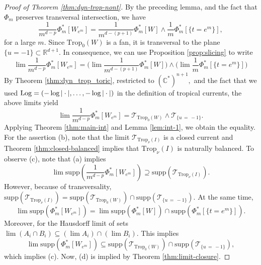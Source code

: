 \documentclass[11pt]{amsart}
\def\Log{{\rm Log}}
\theoremstyle{definition}
\newcommand{\R}{\mathbb{R}}
\newcommand{\C}{\mathbb{C}}
\newcommand{\sT}{\mathscr{T}}
\newcommand{\Trop}{\mathrm{Trop}}
\newcommand{\supp}[1]{{\mathrm{supp}(#1)}}
\begin{document}
\begin{proof}[Proof of Theorem \ref{thm:dyn-trop-nont}]
  By the preceding lemma, and the fact that $\Phi_m$ preserves transversal intersection, we have 
  $$ \frac{1}{m^{d-p}}\Phi_m^* [W_{e^m}] = \frac{1}{m^{d-(p+1)}} \Phi_m^*[W] \wedge \frac{1}{m} \Phi_m^*[\{t= e^m\}],$$
  for a large $m.$ Since $\Trop_0(W)$ is a fan, it is transversal to the plane $\{u =-1\} \subset \R^{d+1}$. In consequence, we can use Proposition \ref{prop:slicing} to write
  $$
  \lim \frac{1}{m^{d-p}}\Phi_m^* [W_{e^m}] = \big(\lim  \frac{1}{m^{d-(p+1)}} \Phi_m^*[W]   \big) \wedge \big(\lim \frac{1}{m} \Phi_m^*[\{t= e^m\}] \big)
  $$
 By Theorem \ref{thm:dyn_trop_toric}, restricted to $(\C^*)^{n+1},$ and the fact that we used $\Log = (-\log|\cdot| , \dots , -\log|\cdot|)$ in the definition of tropical currents,  the above limits yield
  $$
    \lim \frac{1}{m^{d-p}}\Phi_m^* [W_{e^m}] = \sT_{\Trop_0(W)} \wedge \sT_{\{u\, = \, -1\}}.
  $$
  Applying Theorem \ref{thm:main-int} and Lemma \ref{lem:int-1}, we obtain the equality. 
  \vskip 2mm
  For the assertion (b), note that the limit $\sT_{\Trop_{\nu}(I)}$ is a closed current and Theorem \ref{thm:closed-balanced} implies that $\Trop_{\nu}(I)$ is naturally balanced. To observe (c), note that (a) implies 
  $$
  \lim \supp{\frac{1}{m^{d-p}}\Phi_m^* [W_{e^m}]}  \supseteq \supp{\sT_{\Trop_{\nu}(I)}}.
  $$
  However, because of transversality,   $\supp{\sT_{\Trop_{\nu}(I)}} = \supp{\sT_{\Trop_0(W)}} \cap \supp{ \sT_{\{u\, = \, -1\}}}.$ At the same time, 
 $$
  \lim \supp{\Phi_m^*[W_{e^m}]} = \lim \supp { \Phi_m^*[W] } \cap \supp{\Phi_m^*[\{t= e^m\}]}.
 $$
Moreover, for the Hausdorff limit of sets $\lim (A_i \cap B_i) \subseteq (\lim A_i) \cap (\lim B_i).$ This implies
$$
  \lim \supp{\Phi_m^*[W_{e^m}]} \subseteq \supp{\sT_{\Trop_0(W)}} \cap \supp{ \sT_{\{u\, = \, -1\}}},
$$
  which implies (c). Now, (d) is implied by Theorem \ref{thm:limit-closure}.
\end{proof}
\end{document}
